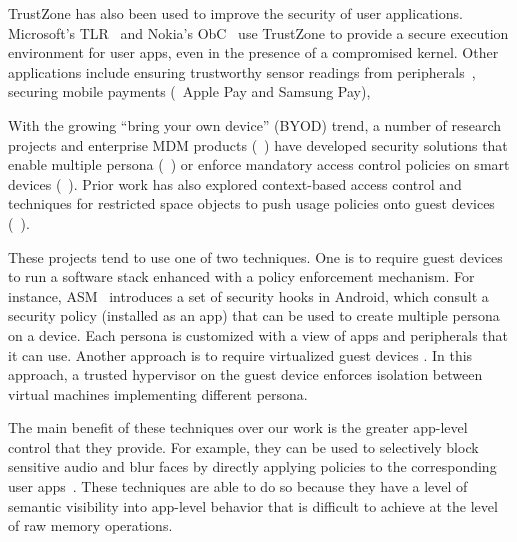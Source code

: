 TrustZone has also been used to improve the security of user applications.
Microsoft's TLR~\cite{tlr:asplos14} and Nokia's ObC~\cite{obc:asiaccs09} use
TrustZone to provide a secure execution environment for user apps, even in the
presence of a compromised kernel. Other applications include ensuring
trustworthy sensor readings from peripherals~\cite{tenor:mobisys12}, securing
mobile payments (\eg~Apple Pay and Samsung Pay), 

 With the growing ``bring your own device''
(BYOD) trend, a number of research projects and enterprise MDM products
(\eg~\cite{knox:mdm,ms:intune,blackberry:emm}) have developed security
solutions that enable multiple persona
(\eg~\cite{asm:sec14,flaskdroid:sec13,cells:sosp11}) or enforce mandatory
access control policies on smart devices
(\eg~\cite{deepdroid:ndss15,seandroid:ndss13,flaskdroid:sec13,asm:sec14}).
Prior work has also explored context-based access control and techniques for
restricted space objects to push usage policies onto guest devices
(\eg~\cite{saint:acsac09,Covington2002,conxsense:asiaccs14,worlddriven:ccs14,blindspot:2009,markit:upside14}).

These projects tend to use one of two techniques. One is to require guest
devices to run a software stack enhanced with a policy enforcement mechanism.
For instance, ASM~\cite{asm:sec14} introduces a set of security hooks in
Android, which consult a security policy (installed as an app) that can be used
to create multiple persona on a device. Each persona is customized with a view
of apps and peripherals that it can use. Another approach is to require
virtualized guest devices
\cite{cells:sosp11,cox:hotmobile07,vmwareverizon,kvmarm:asplos14}. In this
approach, a trusted hypervisor on the guest device enforces isolation between
virtual machines implementing different persona.

The main benefit of these techniques over our work is the greater app-level
control that they provide. For example, they can be used to selectively block
sensitive audio and blur faces by directly applying policies to the
corresponding user apps~\cite{worlddriven:ccs14,ar:sec13}. These techniques
are able to do so because they have a level of semantic visibility into
app-level behavior that is difficult to achieve at the level of raw memory
operations.

